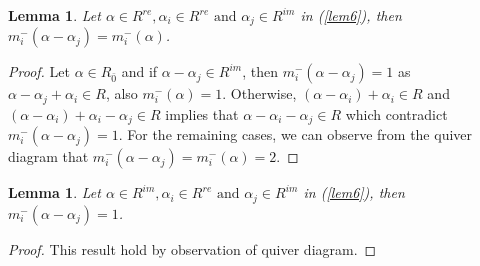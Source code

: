 \documentclass[11pt]{amsart}
\theoremstyle{plain}
\newtheorem{lemma}[thm]{Lemma}
\theoremstyle{definition}
\numberwithin{equation}{section}
\newcommand{\al}{\alpha}
\begin{document}
	\begin{lemma}\label{lem13}
		Let $\al\in R^{re},\al_i\in R^{re}\text{ and }\al_j\in R^{im}$ in (\ref{lem6}), then $m_i^-(\al-\al_j)=m_i^-(\al)$.
	\end{lemma}
	\begin{proof}
		Let $\al\in R_{\bar{0}}$ and if $\al-\al_j\in R^{im}$, then $m_i^-(\al-\al_j)=1$ as $\al-\al_j+\al_i\in R$, also $m_i^-(\al)=1$. Otherwise, $(\al-\al_i)+\al_i\in R$ and $(\al-\al_i)+\al_i-\al_j\in R$ implies that $\al-\al_i-\al_j\in R$ which contradict $m_i^-(\al-\al_j)=1$. For the remaining cases, we can observe from the quiver diagram that $m_i^-(\al-\al_j)=m_i^-(\al)=2$.
	\end{proof}
	\begin{lemma}\label{lem14}
		Let $\al\in R^{im},\al_i\in R^{re}\text{ and }\al_j\in R^{im}$ in (\ref{lem6}), then $m_i^-(\al-\al_j)=1$.
	\end{lemma}
    \begin{proof}
        This result hold by observation of quiver diagram.
    \end{proof}
\end{document}
